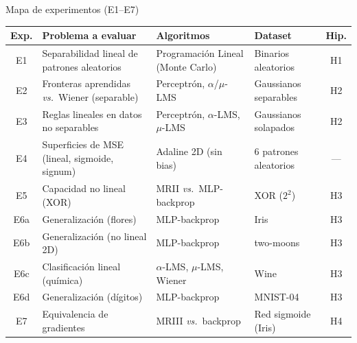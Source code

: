 \documentclass[aspectratio=169, 11pt, xcolor={dvipsnames,table}]{beamer}
\newcommand{\azul}[1]{\textcolor{UsachAzul}{#1}}
\begin{document}
\begin{frame}{Mapa de experimentos (E1--E7)}
{}
\footnotesize
\renewcommand{\arraystretch}{1.25}
\begin{tabular}{@{}c p{} p{} p{} c@{}}
\toprule
\textbf{Exp.} & \textbf{Problema a evaluar} & \textbf{Algoritmos} & \textbf{Dataset} & \textbf{Hip.} \\
\midrule
E1  & Separabilidad lineal de patrones aleatorios & Programaci\'on Lineal (Monte Carlo) & Binarios aleatorios & \azul{H1} \\
E2  & Fronteras aprendidas \emph{vs.}\ Wiener (separable) & Perceptrón, $\alpha$/$\mu$-LMS & Gaussianos separables & \azul{H2} \\
E3  & Reglas lineales en datos no separables & Perceptr\'on, $\alpha$-LMS, $\mu$-LMS & Gaussianos solapados & \azul{H2} \\
E4  & Superficies de MSE (lineal, sigmoide, signum) & Adaline 2D (sin bias) & 6 patrones aleatorios & --- \\
E5  & Capacidad no lineal (XOR) & MRII \emph{vs.}\ MLP-backprop & XOR ($2^2$) & \azul{H3} \\
E6a & Generalización (flores) & MLP-backprop & Iris & \azul{H3} \\
E6b & Generalización (no lineal 2D) & MLP-backprop & two-moons & \azul{H3} \\
E6c & Clasificación lineal (química) & $\alpha$-LMS, $\mu$-LMS, Wiener & Wine & \azul{H3} \\
E6d & Generalización (dígitos) & MLP-backprop & MNIST-04 & \azul{H3} \\
E7  & Equivalencia de gradientes & MRIII \emph{vs.}\ backprop & Red sigmoide (Iris) & \azul{H4} \\
\bottomrule
\end{tabular}

\vspace{4pt}



\end{frame}
\end{document}
